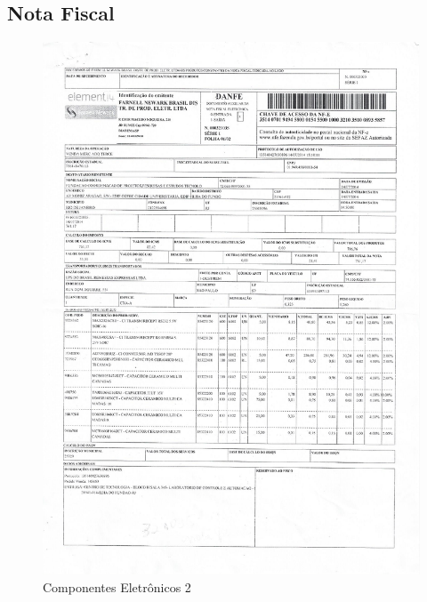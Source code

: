 \subsection{Nota Fiscal}
\begin{figure}[H]
 \centering
 \includegraphics[width=0.9\columnwidth]{Componentes_Eletronicos_2/nota_eletronica2.pdf}
 \caption{Componentes Eletrônicos 2}
 \end{figure}